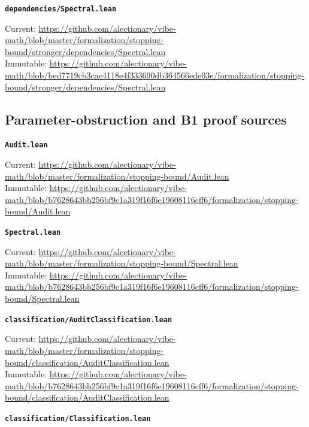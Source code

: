 \smallskip
\medskip
\par\noindent\textbf{\texttt{dependencies/Spectral.lean}}\par\nopagebreak
{\footnotesize\noindent Current: \url{https://github.com/alectionary/vibe-math/blob/master/formalization/stopping-bound/stronger/dependencies/Spectral.lean}\\
Immutable: \url{https://github.com/alectionary/vibe-math/blob/bed7719cb3cac4118e4f333690db364566ede03e/formalization/stopping-bound/stronger/dependencies/Spectral.lean}\par}
\smallskip
\subsection{Parameter-obstruction and B1 proof sources}
\medskip
\par\noindent\textbf{\texttt{Audit.lean}}\par\nopagebreak
{\footnotesize\noindent Current: \url{https://github.com/alectionary/vibe-math/blob/master/formalization/stopping-bound/Audit.lean}\\
Immutable: \url{https://github.com/alectionary/vibe-math/blob/b7628643bb256bf9c1a319f16f6e19608116cff6/formalization/stopping-bound/Audit.lean}\par}
\smallskip
\medskip
\par\noindent\textbf{\texttt{Spectral.lean}}\par\nopagebreak
{\footnotesize\noindent Current: \url{https://github.com/alectionary/vibe-math/blob/master/formalization/stopping-bound/Spectral.lean}\\
Immutable: \url{https://github.com/alectionary/vibe-math/blob/b7628643bb256bf9c1a319f16f6e19608116cff6/formalization/stopping-bound/Spectral.lean}\par}
\smallskip
\medskip
\par\noindent\textbf{\texttt{classification/AuditClassification.lean}}\par\nopagebreak
{\footnotesize\noindent Current: \url{https://github.com/alectionary/vibe-math/blob/master/formalization/stopping-bound/classification/AuditClassification.lean}\\
Immutable: \url{https://github.com/alectionary/vibe-math/blob/b7628643bb256bf9c1a319f16f6e19608116cff6/formalization/stopping-bound/classification/AuditClassification.lean}\par}
\smallskip
\medskip
\par\noindent\textbf{\texttt{classification/Classification.lean}}\par\nopagebreak
